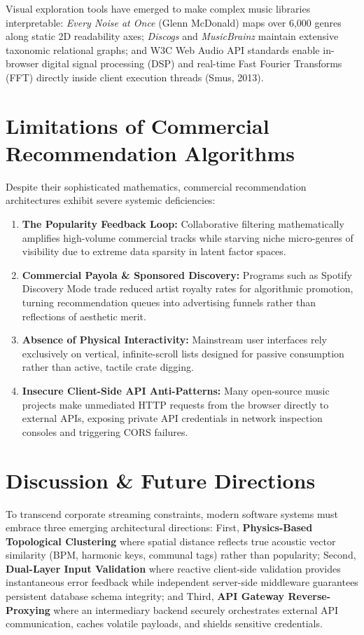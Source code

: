 \documentclass[12pt,a4paper,oneside]{report}
\begin{document}
Visual exploration tools have emerged to make complex music libraries interpretable: \textit{Every Noise at Once} (Glenn McDonald) maps over 6,000 genres along static 2D readability axes; \textit{Discogs} and \textit{MusicBrainz} maintain extensive taxonomic relational graphs; and W3C Web Audio API standards enable in-browser digital signal processing (DSP) and real-time Fast Fourier Transforms (FFT) directly inside client execution threads (Smus, 2013).

\section{Limitations of Commercial Recommendation Algorithms}
Despite their sophisticated mathematics, commercial recommendation architectures exhibit severe systemic deficiencies:
\begin{enumerate}
    \item \textbf{The Popularity Feedback Loop:} Collaborative filtering mathematically amplifies high-volume commercial tracks while starving niche micro-genres of visibility due to extreme data sparsity in latent factor spaces.
    \item \textbf{Commercial Payola \& Sponsored Discovery:} Programs such as Spotify Discovery Mode trade reduced artist royalty rates for algorithmic promotion, turning recommendation queues into advertising funnels rather than reflections of aesthetic merit.
    \item \textbf{Absence of Physical Interactivity:} Mainstream user interfaces rely exclusively on vertical, infinite-scroll lists designed for passive consumption rather than active, tactile crate digging.
    \item \textbf{Insecure Client-Side API Anti-Patterns:} Many open-source music projects make unmediated HTTP requests from the browser directly to external APIs, exposing private API credentials in network inspection consoles and triggering CORS failures.
\end{enumerate}

\section{Discussion \& Future Directions}
To transcend corporate streaming constraints, modern software systems must embrace three emerging architectural directions:
First, \textbf{Physics-Based Topological Clustering} where spatial distance reflects true acoustic vector similarity (BPM, harmonic keys, communal tags) rather than popularity;
Second, \textbf{Dual-Layer Input Validation} where reactive client-side validation provides instantaneous error feedback while independent server-side middleware guarantees persistent database schema integrity; and
Third, \textbf{API Gateway Reverse-Proxying} where an intermediary backend securely orchestrates external API communication, caches volatile payloads, and shields sensitive credentials.
\end{document}
